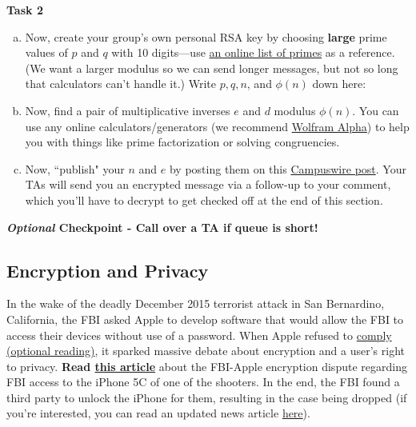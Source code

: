 \documentclass[12pt,letterpaper]{article}
\newif\ifsol
\newcommand{\solu}[2]{ \begin{mdframed} \ifsol #2 \else \vspace{#1} \fi \end{mdframed} }
\begin{document}
\textbf{Task 2}
\begin{enumerate}[a.]
    \item Now, create your group’s own personal RSA key by choosing \textbf{large} prime values of $p$ and $q$ with 10 digits---use \href{https://primes.utm.edu/lists/small/small.html}{an online list of primes} as a reference. (We want a larger modulus so we can send longer messages, but not so long that calculators can't handle it.) Write $p, q, n$, and $\phi(n)$ down here:

\solu{1cm}{TAs - make sure that $p$ and $q$ are large! The modulus has to be greater than any message we want to send, which we restricted on our end to be 18 digits or less.}

\item Now, find a pair of multiplicative inverses $e$ and $d$ modulus $\phi(n)$. You can use any online calculators/generators (we recommend \href{https://www.wolframalpha.com/}{Wolfram Alpha}) to help you with things like prime factorization or solving congruencies.
\solu{2cm}{TAs - just ask how they did this part to make sure they understand what's going on. One way of finding a $e$ is just prime factorizing $\phi(n)$ and making a new number that doesn't share any of those numbers. Then, plug $de \equiv 1 \pmod{\phi(n)}$ into Wolfram Alpha to solve for $d$. In class, we pointed out that picking a random number in the right range and running Euclid will work quickly and accurately.}

\item Now, ``publish" your $n$ and $e$ by posting them on this \href{https://campuswire.com/c/GA754240A/feed/442}{Campuswire post}. Your TAs will send you an encrypted message via a follow-up to your comment, which you'll have to decrypt to get checked off at the end of this section.
\end{enumerate}

\textbf{\textit{Optional} Checkpoint - Call over a TA if queue is short!}

\pagebreak


\subsection*{Encryption and Privacy}
  
    In the wake of the deadly December 2015 terrorist attack in San Bernardino, California, the FBI asked Apple to develop software that would allow the FBI to access their devices without use of a password. When Apple refused to \href{https://www.apple.com/customer-letter/}{comply (optional reading)}, it sparked massive debate about encryption and a user's right to privacy. \textbf{Read \href{https://www.bbc.com/news/technology-35601035}{this article}} about the FBI-Apple encryption dispute regarding FBI access to the iPhone 5C of one of the shooters. In the end, the FBI found a third party to unlock the iPhone for them, resulting in the case being dropped (if you're interested, you can read an updated news article \href{https://www.washingtonpost.com/technology/2021/04/14/azimuth-san-bernardino-apple-iphone-fbi/}{here}).
    
\end{document}
